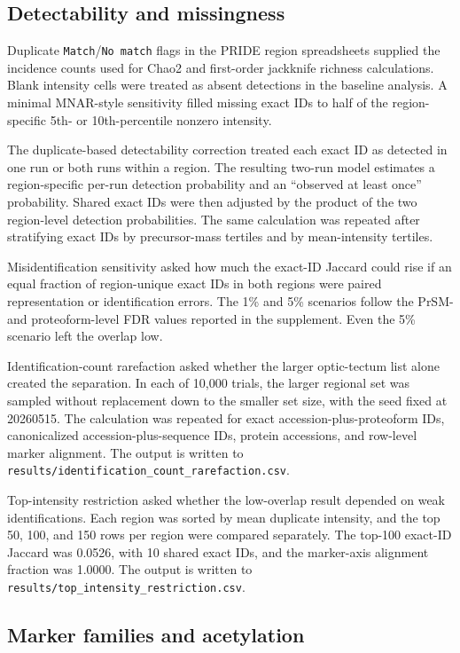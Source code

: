 \subsection{Detectability and missingness}

Duplicate \texttt{Match}/\texttt{No match} flags in the PRIDE region spreadsheets supplied the incidence counts used for Chao2 and first-order jackknife richness calculations. Blank intensity cells were treated as absent detections in the baseline analysis. A minimal MNAR-style sensitivity filled missing exact IDs to half of the region-specific 5th- or 10th-percentile nonzero intensity.

The duplicate-based detectability correction treated each exact ID as detected in one run or both runs within a region. The resulting two-run model estimates a region-specific per-run detection probability and an ``observed at least once'' probability. Shared exact IDs were then adjusted by the product of the two region-level detection probabilities. The same calculation was repeated after stratifying exact IDs by precursor-mass tertiles and by mean-intensity tertiles.

Misidentification sensitivity asked how much the exact-ID Jaccard could rise if an equal fraction of region-unique exact IDs in both regions were paired representation or identification errors. The 1\% and 5\% scenarios follow the PrSM- and proteoform-level FDR values reported in the supplement. Even the 5\% scenario left the overlap low.

Identification-count rarefaction asked whether the larger optic-tectum list alone created the separation. In each of 10{,}000 trials, the larger regional set was sampled without replacement down to the smaller set size, with the seed fixed at 20260515. The calculation was repeated for exact accession-plus-proteoform IDs, canonicalized accession-plus-sequence IDs, protein accessions, and row-level marker alignment. The output is written to \texttt{results/identification\_count\_rarefaction.csv}.

Top-intensity restriction asked whether the low-overlap result depended on weak identifications. Each region was sorted by mean duplicate intensity, and the top 50, 100, and 150 rows per region were compared separately. The top-100 exact-ID Jaccard was 0.0526, with 10 shared exact IDs, and the marker-axis alignment fraction was 1.0000. The output is written to \texttt{results/top\_intensity\_restriction.csv}.

\subsection{Marker families and acetylation}

